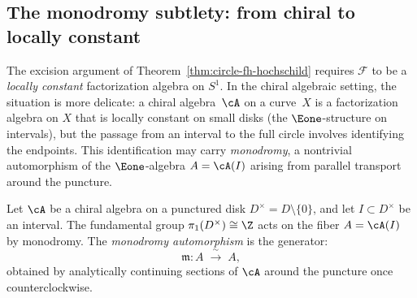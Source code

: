 \subsection{The monodromy subtlety: from chiral to locally constant}
\label{subsec:monodromy-subtlety}


The excision argument of Theorem~\ref{thm:circle-fh-hochschild}
requires $\mathcal{F}$ to be a \emph{locally constant} factorization
algebra on $S^1$. In the chiral algebraic setting, the situation is
more delicate: a chiral algebra~$\cA$ on a curve~$X$ is a
factorization algebra on $X$ that is locally constant on small disks
(the $\Eone$-structure on intervals), but the passage from an interval
to the full circle involves identifying the endpoints. This
identification may carry \emph{monodromy}, a nontrivial automorphism
of the $\Eone$-algebra $A = \cA(I)$ arising from parallel transport
around the puncture.

\begin{definition}\label{def:monodromy-aut}
Let $\cA$ be a chiral algebra on a punctured disk $D^\times = D
\setminus \{0\}$, and let $I \subset D^\times$ be an interval.
The fundamental group $\pi_1(D^\times) \cong \Z$ acts on the
fiber $A = \cA(I)$ by monodromy. The \emph{monodromy
automorphism} is the generator:
\[
\mathfrak{m}\colon A \;\xrightarrow{\;\sim\;}\; A,
\]
obtained by analytically continuing sections of $\cA$ around the
puncture once counterclockwise.
\end{definition}

